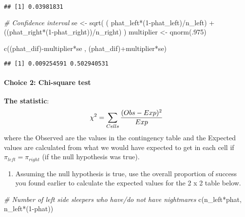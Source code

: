 \documentclass[
]{article}
\newenvironment{Shaded}{\begin{snugshade}}{\end{snugshade}}
\newcommand{\CommentTok}[1]{\textcolor[rgb]{0.56,0.35,0.01}{\textit{#1}}}
\newcommand{\DecValTok}[1]{\textcolor[rgb]{0.00,0.00,0.81}{#1}}
\newcommand{\FunctionTok}[1]{\textcolor[rgb]{0.00,0.00,0.00}{#1}}
\newcommand{\NormalTok}[1]{#1}
\newcommand{\OtherTok}[1]{\textcolor[rgb]{0.56,0.35,0.01}{#1}}
\newcommand{\SpecialCharTok}[1]{\textcolor[rgb]{0.00,0.00,0.00}{#1}}
\providecommand{\tightlist}{%
  \setlength{\itemsep}{0pt}\setlength{\parskip}{0pt}}
\begin{document}
\begin{verbatim}
## [1] 0.03981831
\end{verbatim}

\begin{Shaded}
\begin{Highlighting}[]
\CommentTok{\# Confidence interval}
\NormalTok{se }\OtherTok{\textless{}{-}} \FunctionTok{sqrt}\NormalTok{( ( phat\_left}\SpecialCharTok{*}\NormalTok{(}\DecValTok{1}\SpecialCharTok{{-}}\NormalTok{phat\_left)}\SpecialCharTok{/}\NormalTok{n\_left) }\SpecialCharTok{+}\NormalTok{ ((phat\_right}\SpecialCharTok{*}\NormalTok{(}\DecValTok{1}\SpecialCharTok{{-}}\NormalTok{phat\_right))}\SpecialCharTok{/}\NormalTok{n\_right) )}
\NormalTok{multiplier }\OtherTok{\textless{}{-}} \FunctionTok{qnorm}\NormalTok{(.}\DecValTok{975}\NormalTok{)}

\FunctionTok{c}\NormalTok{((phat\_dif)}\SpecialCharTok{{-}}\NormalTok{multiplier}\SpecialCharTok{*}\NormalTok{se , (phat\_dif)}\SpecialCharTok{+}\NormalTok{multiplier}\SpecialCharTok{*}\NormalTok{se)}
\end{Highlighting}
\end{Shaded}

\begin{verbatim}
## [1] 0.009254591 0.502940531
\end{verbatim}

\hypertarget{choice-2-chi-square-test}{%
\paragraph{Choice 2: Chi-square test}\label{choice-2-chi-square-test}}

\textbf{The statistic}:
\[\small \chi^2 = \sum_{Cells} \frac{(Obs-Exp)^2}{Exp}\] where the
Observed are the values in the contingency table and the Expected values
are calculated from what we would have expected to get in each cell if
\(\pi_{left}=\pi_{right}\) (if the null hypothesis was true).

\begin{enumerate}
\def\labelenumi{(\arabic{enumi})}
\setcounter{enumi}{8}
\tightlist
\item
  Assuming the null hypothesis is true, use the overall proportion of
  success you found earlier to calculate the expected values for the 2 x
  2 table below.
\end{enumerate}

\begin{Shaded}
\begin{Highlighting}[]
\CommentTok{\# Number of left side sleepers who have/do not have nightmares}
\FunctionTok{c}\NormalTok{(n\_left}\SpecialCharTok{*}\NormalTok{phat, n\_left}\SpecialCharTok{*}\NormalTok{(}\DecValTok{1}\SpecialCharTok{{-}}\NormalTok{phat))}
\end{Highlighting}
\end{Shaded}
\end{document}
